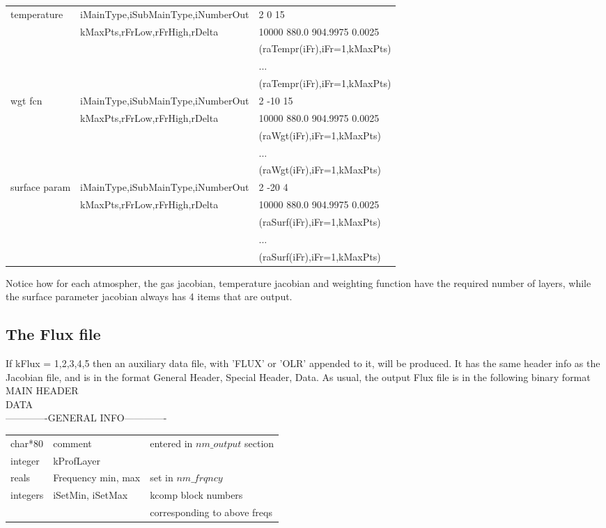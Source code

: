 \documentclass[12pt]{article}
\newlength{\colwidth}
\begin{document}
{{{{\begin{longtable}{llp{\colwidth}}
temperature   & iMainType,iSubMainType,iNumberOut  & 2 0 15\\
              & kMaxPts,rFrLow,rFrHigh,rDelta  & 10000 880.0 904.9975 0.0025 \\
              & & (raTempr(iFr),iFr=1,kMaxPts)\\
              & & ... \\ 
              & & (raTempr(iFr),iFr=1,kMaxPts)\\
wgt fcn       & iMainType,iSubMainType,iNumberOut  & 2 -10 15\\
              & kMaxPts,rFrLow,rFrHigh,rDelta  & 10000 880.0 904.9975 0.0025 \\
              & & (raWgt(iFr),iFr=1,kMaxPts)\\
              & & ... \\ 
              & & (raWgt(iFr),iFr=1,kMaxPts)\\
surface param & iMainType,iSubMainType,iNumberOut  & 2 -20 4\\
              & kMaxPts,rFrLow,rFrHigh,rDelta  & 10000 880.0 904.9975 0.0025 \\
              & & (raSurf(iFr),iFr=1,kMaxPts)\\
              & & ... \\ 
              & & (raSurf(iFr),iFr=1,kMaxPts)\\
\end{longtable}

Notice how for each atmospher, the gas jacobian, temperature jacobian and 
weighting function have the required number of layers, while the surface
parameter jacobian always has 4 items that are output.

\subsection{ The Flux file}

If kFlux = 1,2,3,4,5 then an auxiliary data file, with 'FLUX' or 'OLR' 
appended to it, will be produced.  It has the same header info as the 
Jacobian file, and is in the format General Header, Special Header, Data.  
As usual, the output Flux file is in the following binary format\\
MAIN HEADER\\
DATA\\

-------------GENERAL INFO-------------\\
\begin{longtable}{llp{\colwidth}}
{\sf char*80}    & comment & entered in $nm\_output$ section\\
{\sf integer}    & kProfLayer &\\
{\sf reals}      & Frequency min, max &set in $nm\_frqncy$\\
{\sf integers}   & iSetMin, iSetMax  & kcomp block numbers \\
                 &                   & corresponding to above freqs \\
\end{longtable}

}}}}
\end{document}
